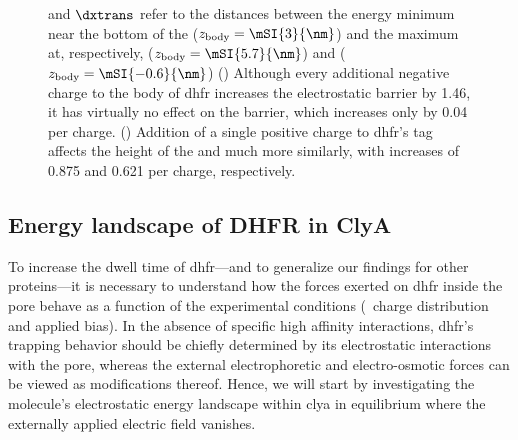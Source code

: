 \begin{figure*}[p]
{    and $\dxtrans$ refer to the distances between the energy minimum near the bottom of the \lumen{}
    ($z_{\rm{body}} = \mSI{3}{\nm}$) and the maximum at, respectively, \cisi{} ($z_{\rm{body}} =
    \mSI{5.7}{\nm}$) and \transi{} ($z_{\rm{body}} = \mSI{-0.6}{\nm}$)
    ()
    Although every additional negative charge to the body of \gls{dhfr} increases the \transi{} electrostatic
    barrier by \SI{1.46}{\kT}, it has virtually no effect on the \cisi{} barrier, which increases only by
    \SI{0.04}{\kT} per charge.
    ()
    Addition of a single positive charge to \gls{dhfr}'s tag affects the height of the \transi{} and \cisi{}
    much more similarly, with increases of \SI{0.875}{\kT} and \SI{0.621}{\kT} per charge, respectively.
  }\label{fig:apbs_simulation_results}
\end{figure*}
%


\subsection{Energy landscape of {DHFR} in {ClyA}}
%

To increase the dwell time of \gls{dhfr}---and to generalize our findings for other proteins---it is necessary
to understand how the forces exerted on \gls{dhfr} inside the pore behave as a function of the experimental
conditions (\ie~charge distribution and applied bias). In the absence of specific high affinity interactions,
\gls{dhfr}'s trapping behavior should be chiefly determined by its electrostatic interactions with the pore,
whereas the external electrophoretic and electro-osmotic forces can be viewed as modifications thereof. Hence,
we will start by investigating the molecule's electrostatic energy landscape within \gls{clya} in equilibrium
where the externally applied electric field vanishes.

